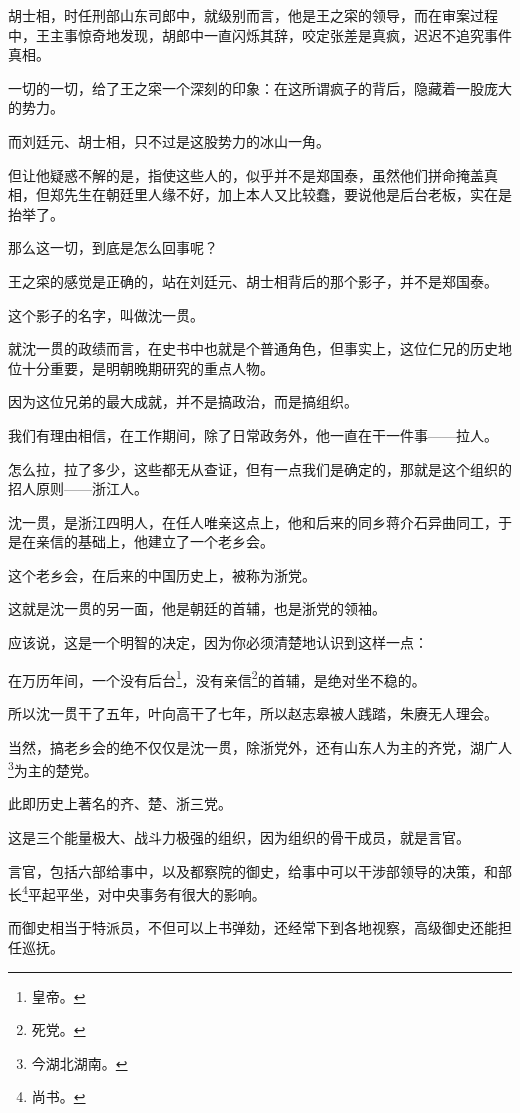 \begin{multicols}{\theparacolNo}
		胡士相，时任刑部山东司郎中，就级别而言，他是王之寀的领导，而在审案过程中，王主事惊奇地发现，胡郎中一直闪烁其辞，咬定张差是真疯，迟迟不追究事件真相。

		一切的一切，给了王之寀一个深刻的印象：在这所谓疯子的背后，隐藏着一股庞大的势力。

		而刘廷元、胡士相，只不过是这股势力的冰山一角。

		但让他疑惑不解的是，指使这些人的，似乎并不是郑国泰，虽然他们拼命掩盖真相，但郑先生在朝廷里人缘不好，加上本人又比较蠢，要说他是后台老板，实在是抬举了。

		那么这一切，到底是怎么回事呢？

		王之寀的感觉是正确的，站在刘廷元、胡士相背后的那个影子，并不是郑国泰。

		这个影子的名字，叫做沈一贯。

		就沈一贯的政绩而言，在史书中也就是个普通角色，但事实上，这位仁兄的历史地位十分重要，是明朝晚期研究的重点人物。

		因为这位兄弟的最大成就，并不是搞政治，而是搞组织。

		我们有理由相信，在工作期间，除了日常政务外，他一直在干一件事——拉人。

		怎么拉，拉了多少，这些都无从查证，但有一点我们是确定的，那就是这个组织的招人原则——浙江人。

		沈一贯，是浙江四明人，在任人唯亲这点上，他和后来的同乡蒋介石异曲同工，于是在亲信的基础上，他建立了一个老乡会。

		这个老乡会，在后来的中国历史上，被称为浙党。

		这就是沈一贯的另一面，他是朝廷的首辅，也是浙党的领袖。

		应该说，这是一个明智的决定，因为你必须清楚地认识到这样一点：

		在万历年间，一个没有后台\footnote{皇帝。}，没有亲信\footnote{死党。}的首辅，是绝对坐不稳的。

		所以沈一贯干了五年，叶向高干了七年，所以赵志皋被人践踏，朱赓无人理会。

		当然，搞老乡会的绝不仅仅是沈一贯，除浙党外，还有山东人为主的齐党，湖广人\footnote{今湖北湖南。}为主的楚党。

		此即历史上著名的齐、楚、浙三党。

		这是三个能量极大、战斗力极强的组织，因为组织的骨干成员，就是言官。

		言官，包括六部给事中，以及都察院的御史，给事中可以干涉部领导的决策，和部长\footnote{尚书。}平起平坐，对中央事务有很大的影响。

		而御史相当于特派员，不但可以上书弹劾，还经常下到各地视察，高级御史还能担任巡抚。


\end{multicols}
